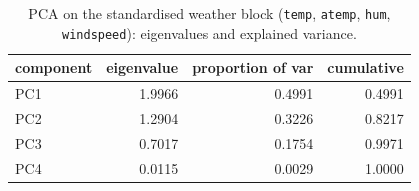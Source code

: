 \begin{table}[htbp]
\centering
\caption{PCA on the standardised weather block (\texttt{temp}, \texttt{atemp}, \texttt{hum}, \texttt{windspeed}): eigenvalues and explained variance.}\label{tab:pca-variance}
\begin{tabular}{lrrr}
\toprule
component & eigenvalue & proportion of var & cumulative \\
\midrule
PC1 & 1.9966 & 0.4991 & 0.4991 \\
PC2 & 1.2904 & 0.3226 & 0.8217 \\
PC3 & 0.7017 & 0.1754 & 0.9971 \\
PC4 & 0.0115 & 0.0029 & 1.0000 \\
\bottomrule
\end{tabular}
\end{table}

